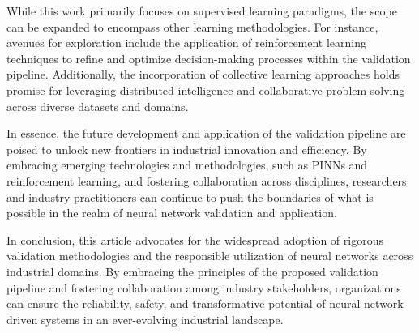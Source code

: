 While this work primarily focuses on supervised learning paradigms, the scope can be expanded to encompass other learning methodologies. For instance, avenues for exploration include the application of reinforcement learning\cite{kaelbling1996reinforcement} techniques to refine and optimize decision-making processes within the validation pipeline. Additionally, the incorporation of collective learning approaches holds promise for leveraging distributed intelligence and collaborative problem-solving across diverse datasets and domains.

In essence, the future development and application of the validation pipeline are poised to unlock new frontiers in industrial innovation and efficiency. By embracing emerging technologies and methodologies, such as PINNs and reinforcement learning, and fostering collaboration across disciplines, researchers and industry practitioners can continue to push the boundaries of what is possible in the realm of neural network validation and application.


In conclusion, this article advocates for the widespread adoption of rigorous validation methodologies and the responsible utilization of neural networks across industrial domains. By embracing the principles of the proposed validation pipeline and fostering collaboration among industry stakeholders, organizations can ensure the reliability, safety, and transformative potential of neural network-driven systems in an ever-evolving industrial landscape.